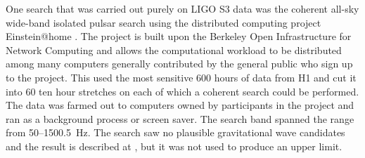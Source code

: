 \documentclass{article}
\begin{document}
One search that was carried out purely on LIGO S3 data was the coherent all-sky
wide-band isolated pulsar search using the distributed computing project
Einstein@home \cite{eath}. The project is built upon the Berkeley Open
Infrastructure for Network Computing \cite{BOINC} and allows the computational
workload to be distributed among many computers generally contributed by the
general public who sign up to the project. This used the most sensitive 600
hours of data from H1 and cut it into 60 ten hour stretches on each of which
a coherent search could be performed. The data was farmed out to computers owned
by participants in the project and ran as a background process or screen saver.
The search band spanned the range from 50--1500.5~Hz. The search saw no
plausible gravitational wave candidates and the result is described at
\cite{eathS3}, but it was not used to produce an upper limit.
\end{document}
